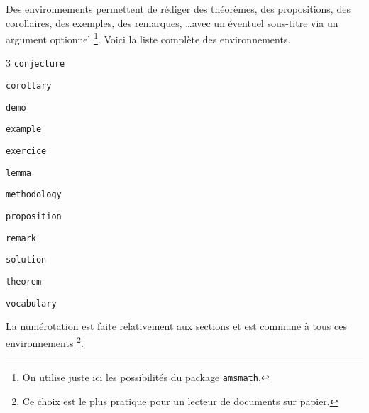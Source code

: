 Des environnements permettent de rédiger des théorèmes, des propositions, des corollaires, des exemples, des remarques, \dots avec un éventuel sous-titre via un argument optionnel
\footnote{
	On utilise juste ici les possibilités du package \texttt{amsmath}.
}. Voici la liste complète des environnements.

\begin{multicols-sep}{3}
	\verb+conjecture+

	\verb+corollary+

	\verb+demo+

	\verb+example+

	\verb+exercice+
	
	\verb+lemma+

	\verb+methodology+

	\verb+proposition+

	\verb+remark+

	\verb+solution+

	\verb+theorem+

	\verb+vocabulary+
\end{multicols-sep}


\medskip


La numérotation est faite relativement aux sections et est commune à tous ces environnements
\footnote{
	Ce choix est le plus pratique pour un lecteur de documents sur papier.
}.
